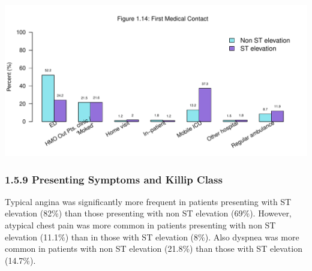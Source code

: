 \documentclass[
]{article}
\begin{document}
\includegraphics{‏‏ACSIS_2024_v1_pdf_without_files/figure-latex/unnamed-chunk-49-1.pdf}

\pagebreak

\subsubsection{1.5.9 Presenting Symptoms and Killip
Class}\label{presenting-symptoms-and-killip-class}

Typical angina was significantly more frequent in patients presenting
with ST elevation (82\%) than those presenting with non ST elevation
(69\%). However, atypical chest pain was more common in patients
presenting with non ST elevation (11.1\%) than in those with ST
elevation (8\%). Also dyspnea was more common in patients with non ST
elevation (21.8\%) than those with ST elevation (14.7\%).

~
\end{document}
